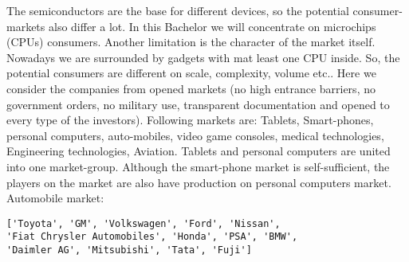 \documentclass[12pt, a4paper]{article}
\begin{document}
The semiconductors are the base for different devices, so the potential consumer-markets also differ a lot. In this Bachelor we will concentrate on microchips (CPUs) consumers. Another limitation is the character of the market itself. Nowadays we are surrounded by gadgets with mat least one CPU inside. So, the potential consumers are different on scale, complexity, volume etc.. Here we consider the companies from opened markets (no high entrance barriers, no government orders, no military use, transparent documentation and opened to every type of the investors). Following markets are: Tablets, Smart-phones, personal computers, auto-mobiles, video game consoles, medical technologies, Engineering technologies, Aviation. Tablets and personal computers are united into one market-group. Although the smart-phone market is self-sufficient, the players on the market are also have production on personal computers market.\\
Automobile market:
\begin{verbatim}
['Toyota', 'GM', 'Volkswagen', 'Ford', 'Nissan', 
'Fiat Chrysler Automobiles', 'Honda', 'PSA', 'BMW',
'Daimler AG', 'Mitsubishi', 'Tata', 'Fuji']
\end{verbatim}
\end{document}
